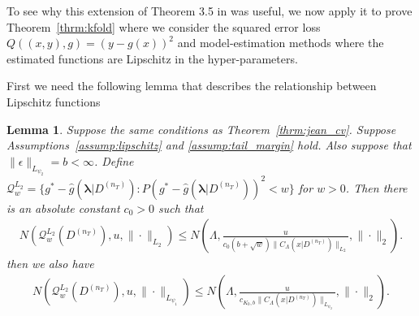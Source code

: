 \documentclass[10pt]{book}
\newtheorem{lemma}{Lemma}
\theoremstyle{definition}
\begin{document}
To see why this extension of Theorem 3.5 in \citet{lecue2012oracle} was useful, we now apply it to prove Theorem~\ref{thrm:kfold} where we consider the squared error loss $Q((x,y), g) = (y - g(x))^2$ and model-estimation methods where the estimated functions are Lipschitz in the hyper-parameters.

First we need the following lemma that describes the relationship between Lipschitz functions
\begin{lemma}
	Suppose the same conditions as Theorem~\ref{thrm:jean_cv}.
	Suppose Assumptions~\ref{assump:lipschitz} and \ref{assump:tail_margin} hold.
	Also suppose that $\|\epsilon\|_{L_{\psi_2}} = b <\infty$.
	Define 
	$\mathcal{Q}_{w}^{L_{2}} = \{g^* - \hat{g}(\boldsymbol{\lambda}|D^{(n_{T})}) : P (g^* - \hat{g}(\boldsymbol{\lambda}|D^{(n_{T})}))^2 < w\}$
	for $w > 0$.
	Then there is an absolute constant $c_0 > 0$ such that
	\begin{align}
	N\left(\mathcal{Q}_{w}^{L_{2}}(D^{(n_{T})}),u,\|\cdot\|_{L_{2}}\right)\le N\left(\Lambda,\frac{u}{c_0 \left(b +\sqrt{w}\right)
		\|C_\Lambda(x|D^{(n_{T})})\|_{L_{2}}},\|\cdot\|_{2}\right).
	\end{align}
	then we also have
	\begin{align}
	N\left(\mathcal{Q}_{w}^{L_{2}}(D^{(n_{T})}),u,\|\cdot\|_{L_{\psi_{1}}}\right)
	\le N\left(
		\Lambda,
		\frac{u}{c_{K_0, b}\|C_\Lambda(x|D^{(n_{T})})\|_{L_{\psi_{2}}}},\|\cdot\|_{2}\right).
	\end{align}
	\label{lemma:covering_lipschitz}
\end{lemma}
\end{document}
